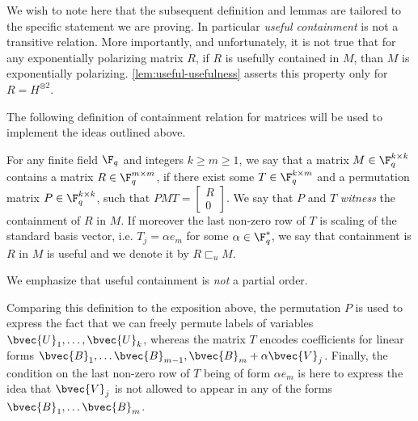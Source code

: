 \documentclass[11pt]{article}
\newcommand{\usef}{\sqsubset_u}
\begin{document}
We wish to note here that the subsequent definition and lemmas are tailored to the specific statement we are proving. In particular \textit{useful containment} is not a transitive relation. More importantly, and unfortunately, it is not true that for any exponentially polarizing matrix $R$, if $R$ is usefully contained in $M$, than $M$ is exponentially polarizing. \cref{lem:useful-usefulness} asserts this property only for $R = H^{\otimes 2}$.


The following definition of containment relation for matrices will be used to implement the ideas outlined above. 

\begin{definition}
	For any finite field $\F_q$ and integers $k\ge m\ge 1$,
	we say that a matrix $M \in \F_q^{k\times k}$ contains a matrix $R \in \F_q^{m\times m}$, if there exist some $T \in \F_q^{k\times m}$ and a permutation matrix $P \in \F_q^{k \times k}$, such that $PMT = \left[\begin{array}{c} R \\ 0 \end{array}\right]$. We say that $P$ and $T$ {\em witness} the containment of $R$ in $M$. If moreover the last non-zero row of $T$ is scaling of the standard basis vector, i.e. $T_j = \alpha e_m$ for some $\alpha\in\F_q^*$, we say that containment is $R$ in $M$ is useful and we denote it by $R \usef M$. 
	
\end{definition}
We emphasize that useful containment is \emph{not} a partial order.

Comparing this definition to the exposition above, the permutation $P$ is used to express the fact that we can freely permute labels of variables $\bvec{U}_1, \ldots, \bvec{U}_k$, whereas the matrix $T$ encodes coefficients for linear forms $\bvec{B}_1, \ldots \bvec{B}_{m-1}, \bvec{B}_m + \alpha \bvec{V}_j$. Finally, the condition on the last non-zero row of $T$ being of form $\alpha e_m$ is here to express the idea that $\bvec{V}_j$ is not allowed to appear in any of the forms $\bvec{B}_1, \ldots \bvec{B}_m$.
\end{document}
